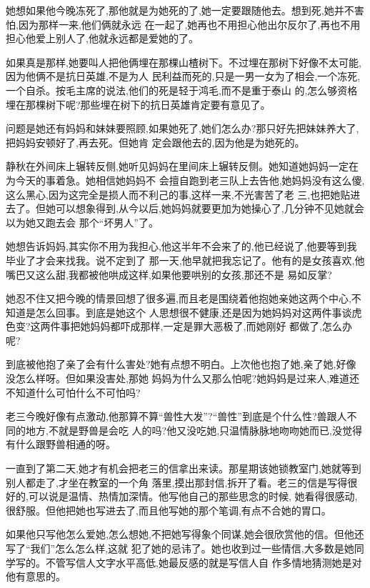 ﻿\documentclass[12pt]{article}
\begin{document}
她想如果他今晚冻死了,那他就是为她死的了,她一定要跟随他去。想到死,她并不害怕,因为那样一来,他们俩就永远
在一起了,她再也不用担心他出尔反尔了,再也不用担心他爱上别人了,他就永远都是爱她的了。


如果真是那样,她要叫人把他俩埋在那棵山楂树下。不过埋在那树下好像不太可能,因为他俩不是抗日英雄,不是为人
民利益而死的,只是一男一女为了相会,一个冻死,一个自杀。按毛主席的说法,他们的死是轻于鸿毛,而不是重于泰山
的,怎么够资格埋在那棵树下呢?那些埋在树下的抗日英雄肯定要有意见了。

问题是她还有妈妈和妹妹要照顾,如果她死了,她们怎么办?那只好先把妹妹养大了,把妈妈安顿好了,再去死。但她肯
定会跟他去的,因为他是为她死的。

静秋在外间床上辗转反侧,她听见妈妈在里间床上辗转反侧。她知道她妈妈一定在为今天的事着急。她相信她妈妈不
会擅自跑到老三队上去告他,她妈妈没有这么傻,这么黑心,因为这完全是损人而不利己的事,这样一来,不光害苦了老
三,也把她贴进去了。但她可以想象得到,从今以后,她妈妈就要更加为她操心了,几分钟不见她就会以为她又跑去会
那个``坏男人''了。

她想告诉妈妈,其实你不用为我担心,他这半年不会来了的,他已经说了,他要等到我毕业了才会来找我。说不定到了
那一天,他早就把我忘记了。他有的是女孩喜欢,他嘴巴又这么甜,我都被他哄成这样,如果他要哄别的女孩,那还不是
易如反掌?

她忍不住又把今晚的情景回想了很多遍,而且老是围绕着他抱她亲她这两个中心,不知道是怎么回事。到底是她这个
人思想很不健康,还是因为她妈妈对这两件事谈虎色变?这两件事把她妈妈都吓成那样,一定是罪大恶极了,而她刚好
都做了,怎么办呢?

到底被他抱了亲了会有什么害处?她有点想不明白。上次他也抱了她,亲了她,好像没怎么样呀。但如果没害处,那她
妈妈为什么又那么怕呢?她妈妈是过来人,难道还不知道什么可怕什么不可怕吗?

老三今晚好像有点激动,他那算不算``兽性大发''?``兽性''到底是个什么性?兽跟人不同的地方,不就是野兽是会吃
人的吗?他又没吃她,只温情脉脉地吻吻她而已,没觉得有什么跟野兽相通的呀。

一直到了第二天,她才有机会把老三的信拿出来读。那星期该她锁教室门,她就等到别人都走了,才坐在教室的一个角
落里,摸出那封信,拆开了看。老三的信是写得很好的,可以说是温情、热情加深情。他写他自己的那些思念的时候,
她看得很感动,很舒服。但他把她也写进去了,而且他写她的那个笔调,有点不合她的胃口。

如果他只写他怎么爱她,怎么想她,不把她写得象个同谋,她会很欣赏他的信。但他还写了``我们''怎么怎么样,这就
犯了她的忌讳了。她也收到过一些情信,大多数是她同学写的。不管写信人文字水平高低,她最反感的就是写信人自
作多情地猜测她是对他有意思的。
\end{document}
